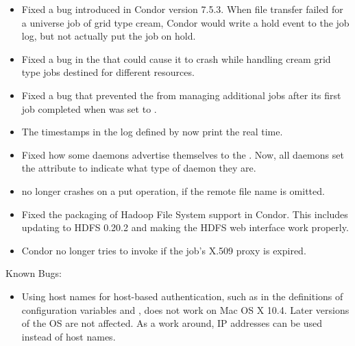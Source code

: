 \begin{itemize}
\item Fixed a bug introduced in Condor version 7.5.3. 
When file transfer failed for a  universe job of grid type 
cream,
Condor would write a hold event to the job log,
but not actually put the job on hold.

\item Fixed a bug in the  that could cause it to crash
while handling cream grid type jobs destined for different resources.

\item Fixed a bug that prevented the  from managing
additional jobs after its first job completed when 
 was set to .

\item The timestamps in the log defined by 
now print the real time.

\item Fixed how some daemons advertise themselves to the .
Now, all daemons set the attribute  to indicate what
type of daemon they are.

\item {} no longer crashes on a put operation,
if the remote file name is omitted.

\item Fixed the packaging of Hadoop File System support in Condor. This includes
updating to HDFS 0.20.2 and making the HDFS web interface work properly.

\item Condor no longer tries to invoke  if the job's X.509 proxy
is expired.

\end{itemize}

\noindent Known Bugs:

\begin{itemize}

\item Using host names for host-based authentication,
such as in the definitions of configuration variables 
 and ,
does not work on Mac OS X 10.4.
Later versions of the OS are not affected.
As a work around, IP addresses can be used instead of host names.

\end{itemize}

